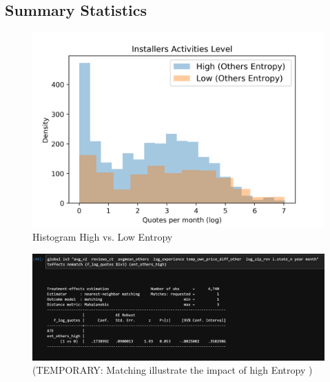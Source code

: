 \documentclass[msom,blindrev]{informs3}
\begin{document}
\subsection{Summary Statistics}
\begin{figure}
	\centering
	\includegraphics[width=0.85\linewidth]{histogram_by_high_low_ent.png}
	\caption{ Histogram High vs. Low Entropy}
	\label{histogram_by_ent_others}
\end{figure}

\begin{figure}
	\centering
	\includegraphics[width=0.7\linewidth]{match_te_ent.png}
	\caption{(TEMPORARY:  Matching illustrate the impact of high Entropy )}
	\label{te_match_entothers}
\end{figure}
\end{document}
